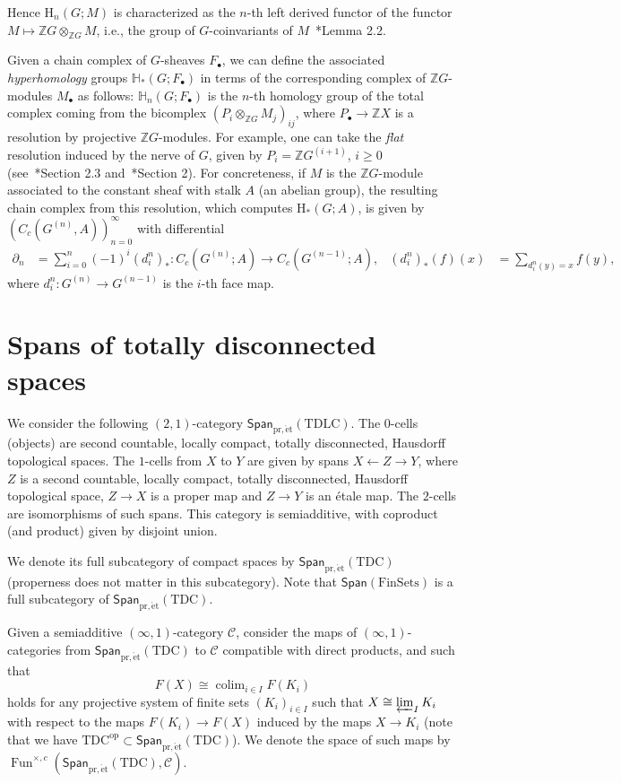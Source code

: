 \documentclass[a4paper,reqno]{amsart}
\theoremstyle{plain}
\theoremstyle{definition}
\theoremstyle{remark}
\numberwithin{equation}{section}
\newcommand{\rH}{\mathrm{H}}
\newcommand{\cC}{\mathcal{C}}
\newcommand{\dH}{\mathbb{H}}
\newcommand{\dZ}{\mathbb{Z}}
\newcommand{\Span}{\mathsf{Span}}
\newcommand{\FinSets}{\mathrm{FinSets}}
\newcommand{\opo}{\mathrm{op}}
\newcommand{\pret}{\mathrm{pr,\acute{e}t}}
\newcommand{\TDLC}{\mathrm{TDLC}}
\newcommand{\TDC}{\mathrm{TDC}}
\DeclareMathOperator{\Fun}{Fun}
\DeclareMathOperator*{\colim}{colim}
\begin{document}
Hence $\rH_n(G;M)$ is characterized as the $n$-th left derived functor of the functor $M\mapsto \dZ G\otimes_{\dZ G} M$, i.e., the group of $G$-coinvariants of $M$~\cite{bdgw:matui}*{Lemma 2.2}.

Given a chain complex of $G$-sheaves $F_\bullet$, we can define the associated \emph{hyperhomology} groups $\dH_*(G;F_\bullet)$ in terms of the corresponding complex of $\dZ G$-modules $M_\bullet$ as follows: $\dH_n(G;F_\bullet)$ is the $n$-th homology group of the total complex coming from the bicomplex $(P_i\otimes_{\dZ G} M_j)_{ij}$, where $P_\bullet\to \dZ X$ is a resolution by projective $\dZ G$-modules. For example, one can take the \emph{flat} resolution induced by the nerve of $G$, given by $P_i=\dZ G^{(i+1)}$, $i\geq 0$ (see~\cite{li:algk}*{Section 2.3} and~\cite{ali:homcor}*{Section 2}).
For concreteness, if $M$ is the $\dZ G$-module associated to the constant sheaf with stalk $A$ (an abelian group), the resulting chain complex from this resolution, which computes $\rH_\ast(G; A)$, is given by $(C_c(G^{(n)},A))_{n = 0}^\infty$ with differential
\begin{align}\label{eq:ghcc}
\partial_n &=\sum_{i=0}^n(-1)^i (d^n_i)_* \colon C_c(G^{(n)}; A) \to C_c(G^{(n-1)}; A),&
(d^n_i)_*(f)(x) &= \sum_{d^n_i(y) = x} f(y),
\end{align}
where $d^n_i\colon G^{(n)}\to G^{(n-1)}$ is the $i$-th face map.

\section{Spans of totally disconnected spaces}\label{sec:span-tot-disc}

We consider the following $(2, 1)$-category $\Span_{\pret}(\TDLC)$.
The $0$-cells (objects) are second countable, locally compact, totally disconnected, Hausdorff topological spaces.
The $1$-cells from $X$ to $Y$ are given by spans $X \leftarrow Z \to Y$, where $Z$ is a second countable, locally compact, totally disconnected, Hausdorff topological space, $Z \to X$ is a proper map and $Z \to Y$ is an étale map.
The $2$-cells are isomorphisms of such spans.
This category is semiadditive, with coproduct (and product) given by disjoint union.

We denote its full subcategory of compact spaces by $\Span_{\pret}(\TDC)$ (properness does not matter in this subcategory).
Note that $\Span(\FinSets)$ is a full subcategory of $\Span_{\pret}(\TDC)$.

Given a semiadditive $(\infty, 1)$-category $\cC$, consider the maps of $(\infty, 1)$-categories from $\Span_{\pret}(\TDC)$ to $\cC$ compatible with direct products, and such that
\begin{equation}\label{eq:continuity-condition-for-finite-quots}
F(X) \cong \colim_{i \in I} F(K_i)
\end{equation}
holds for any projective system of finite sets $(K_i)_{i \in I}$ such that $X \cong \varprojlim_I K_i$ with respect to the maps $F(K_i) \to F(X)$ induced by the maps $X \to K_i$ (note that we have $\TDC^\opo \subset \Span_{\pret}(\TDC)$).
We denote the space of such maps by $\Fun^{\times,c}(\Span_{\pret}(\TDC), \cC)$.
\end{document}
